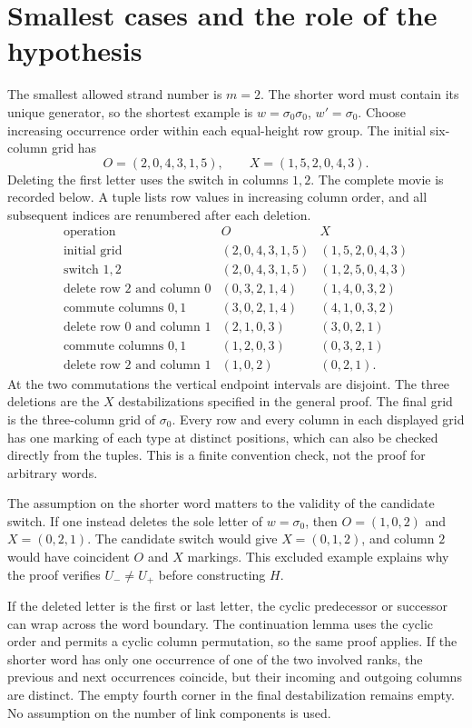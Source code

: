 \documentclass[11pt,oneside]{report}
\theoremstyle{definition}
\numberwithin{equation}{section}
\begin{document}
\section{Smallest cases and the role of the hypothesis}

The smallest allowed strand number is $m=2$. The shorter word must
contain its unique generator, so the shortest example is
$w=\sigma_0\sigma_0$, $w'=\sigma_0$.
Choose increasing occurrence order within each equal-height row group.
The initial six-column grid has
\[
 O=(2,0,4,3,1,5),\qquad X=(1,5,2,0,4,3).
\]
Deleting the first letter uses the switch in columns $1,2$.
The complete movie is recorded below. A tuple lists row values in
increasing column order, and all subsequent indices are renumbered
after each deletion.
\[
\begin{array}{c|c|c}
\text{operation}&O&X\\ \hline
\text{initial grid}&(2,0,4,3,1,5)&(1,5,2,0,4,3)\\
\text{switch }1,2&(2,0,4,3,1,5)&(1,2,5,0,4,3)\\
\text{delete row }2\text{ and column }0&(0,3,2,1,4)&(1,4,0,3,2)\\
\text{commute columns }0,1&(3,0,2,1,4)&(4,1,0,3,2)\\
\text{delete row }0\text{ and column }1&(2,1,0,3)&(3,0,2,1)\\
\text{commute columns }0,1&(1,2,0,3)&(0,3,2,1)\\
\text{delete row }2\text{ and column }1&(1,0,2)&(0,2,1).
\end{array}
\]
At the two commutations the vertical endpoint intervals are disjoint.
The three deletions are the $X$ destabilizations specified in the
general proof. The final grid is the three-column grid of
$\sigma_0$. Every row and every column in each displayed grid has one
marking of each type at distinct positions, which can also be checked
directly from the tuples. This is a finite convention check, not the
proof for arbitrary words.

The assumption on the shorter word matters to the validity of the
candidate switch. If one instead deletes the sole letter of
$w=\sigma_0$, then $O=(1,0,2)$ and $X=(0,2,1)$.
The candidate switch would give $X=(0,1,2)$, and column $2$ would
have coincident $O$ and $X$ markings. This excluded example explains
why the proof verifies $U_-\ne U_+$ before constructing $H$.

If the deleted letter is the first or last letter, the cyclic predecessor
or successor can wrap across the word boundary. The continuation lemma
uses the cyclic order and permits a cyclic column permutation, so the
same proof applies. If the shorter word has only one occurrence of
one of the two involved ranks, the previous and next occurrences
coincide, but their incoming and outgoing columns are distinct.
The empty fourth corner in the final destabilization remains empty.
No assumption on the number of link components is used.
\end{document}
